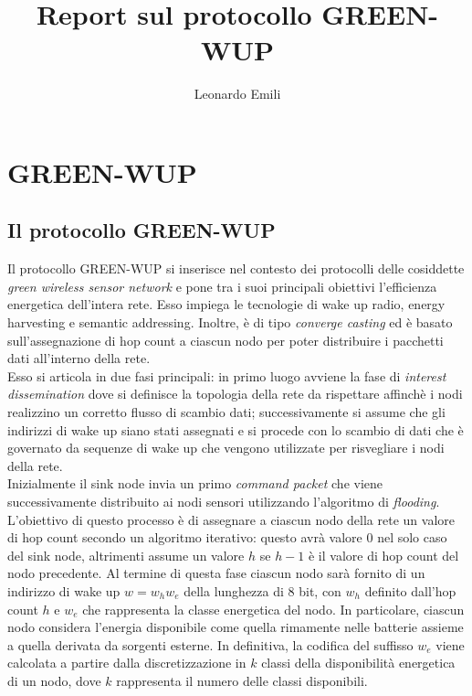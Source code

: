 \documentclass{report}
\title{Report sul protocollo GREEN-WUP}
\author{Leonardo Emili}
\begin{document}
\maketitle
\tableofcontents

\chapter{GREEN-WUP}
\section{Il protocollo GREEN-WUP}

Il protocollo GREEN-WUP si inserisce nel contesto dei protocolli delle cosiddette \emph{green wireless sensor network} e pone tra i suoi principali
obiettivi l'efficienza energetica dell'intera rete. Esso impiega le tecnologie di wake up radio, energy harvesting e semantic addressing. Inoltre, è
di tipo \emph{converge casting} ed è basato sull'assegnazione di hop count a ciascun nodo per poter distribuire i pacchetti dati
all'interno della rete.\\

Esso si articola in due fasi principali: in primo luogo avviene la fase di \emph{interest dissemination} dove si definisce la
topologia della rete da rispettare affinchè i nodi realizzino un corretto flusso di scambio dati; successivamente si assume che gli indirizzi di
wake up siano stati assegnati e si procede con lo scambio di dati che è governato da sequenze di wake up che vengono utilizzate per
risvegliare i nodi della rete.\\

Inizialmente il sink node invia un primo \emph{command packet} che viene successivamente distribuito ai nodi sensori utilizzando l'algoritmo di \emph{flooding}.
L'obiettivo di questo processo è di assegnare a ciascun nodo della rete un valore di hop count secondo un algoritmo iterativo: questo
avrà valore 0 nel solo caso del sink node, altrimenti assume un valore $h$ se $h-1$ è il valore di hop count del nodo precedente. Al termine
di questa fase ciascun nodo sarà fornito di un indirizzo di wake up $w=w_{h}w_{e}$ della lunghezza di 8 bit, con $w_{h}$ definito dall'hop count $h$
e $w_{e}$ che rappresenta la classe energetica del nodo. In particolare, ciascun nodo considera
l'energia disponibile come quella rimamente nelle batterie assieme a quella derivata da sorgenti esterne. In definitiva, la codifica del suffisso $w_{e}$
viene calcolata a partire dalla discretizzazione in $k$ classi della disponibilità energetica di un nodo, dove $k$ rappresenta il numero delle classi
disponibili.\\
\end{document}
